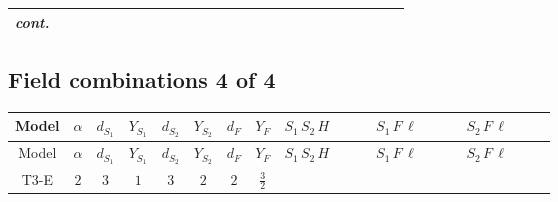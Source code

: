 \documentclass[8pt]{article}
\begin{document}
\begin{landscape}
\begin{longtable}{@{}cccccccc >{\raggedright\arraybackslash}p{0.21\linewidth} >{\raggedright\arraybackslash}p{0.21\linewidth} >{\raggedright\arraybackslash}p{0.21\linewidth}@{}}
\textit{cont.} &  &  &  &  &  &  &  & \scriptsize\adjustbox{max width=\linewidth}{$\begin{gathered} +\frac{1}{2} H_{a_2} S_{1,j_2} H_{a_1}{}^{\dagger } S_{1,j_1}{}^{\dagger } \mathcal{I}_{H1,a_1,a_2,j_2,j_1}{}^2 \lambda_{HS_1}^{(1)}^{(2)}\end{gathered}$} &  & \scriptsize\adjustbox{max width=\linewidth}{$\begin{gathered} +\frac{1}{2} H_{a_2} S_{2,j_2} H_{a_1}{}^{\dagger } S_{2,j_1}{}^{\dagger } \mathcal{I}_{H2,a_1,a_2,j_2,j_1}{}^2 \lambda_{HS_2}^{(1)}^{(2)}\end{gathered}$} \\
\midrule
\bottomrule
\end{longtable}
\clearpage
\subsection*{Field combinations 4 of 4}
\begin{longtable}{@{}cccccccc >{\raggedright\arraybackslash}p{0.21\linewidth} >{\raggedright\arraybackslash}p{0.21\linewidth} >{\raggedright\arraybackslash}p{0.21\linewidth}@{}}
\toprule
Model & $\alpha$ & $d_{S_1}$ & $Y_{S_1}$ & $d_{S_2}$ & $Y_{S_2}$ & $d_F$ & $Y_F$ & $S_1\,S_2\,H$ & $S_1\,F\,\ell$ & $S_2\,F\,\ell$ \\
\midrule
\endfirsthead
\toprule
Model & $\alpha$ & $d_{S_1}$ & $Y_{S_1}$ & $d_{S_2}$ & $Y_{S_2}$ & $d_F$ & $Y_F$ & $S_1\,S_2\,H$ & $S_1\,F\,\ell$ & $S_2\,F\,\ell$ \\
\midrule
\endhead
T3-E & $2$ & $3$ & $1$ & $3$ & $2$ & $2$ & $\frac{3}{2}$ & \scriptsize\adjustbox{max width=\linewidth}{$\begin{gathered} +\overline{\lambda_5} S_{2,j_2} {\mathcal{I}_{LLS_1S_2}}^{*}_{a_1,a_2,j_1,j_2} H_{a_1}{}^{\dagger } H_{a_2}{}^{\dagger } S_{1,j_1}{}^{\dagger } \\ +H_{a_1} H_{a_2} S_{1,j_2} \mathcal{I}_{T3,a_1,a_2,j_2,j_1} \lambda_5 S_{2,j_1}{}^{\dagger }\end{gathered}$} & \scriptsize\adjustbox{max width=\linewidth}{$\begin{gathered} +\overline{L_{a_1,i_1}}\, C\, P_R\, \overline{F_{j_1,r_1}}{}^T S_{1,j_1} y_{1,i_1,r_1} \mathcal{I}_{y_1,a_1,j_1,j_1} \\ +\overline{y_{1,i_1,r_1}} L_{a_1,i_1}{}^T\, C\, P_L\, F_{j_1,r_1} {\mathcal{C}_{LS_1F}}^{*}_{a_1,j_1,j_1} S_{1,j_1}{}^{\dagger }\end{gathered}$} & \scriptsize\adjustbox{max width=\linewidth}{$\begin{gathered} +\overline{y_{2,i_1,r_1}} \overline{F_{j_1,r_1}}\, P_L\, L_{a_1,i_1} S_{2,j_1} {\mathcal{C}_{LS_2F}}^{*}_{a_1,j_1,j_1} \\ +\overline{L_{a_1,i_1}}\, P_R\, F_{j_1,r_1} y_{2,i_1,r_1} \mathcal{I}_{y_2,a_1,j_1,j_1} S_{2,j_1}{}^{\dagger }\end{gathered}$} \\
\midrule
\bottomrule
\end{longtable}
\end{landscape}
\end{document}
